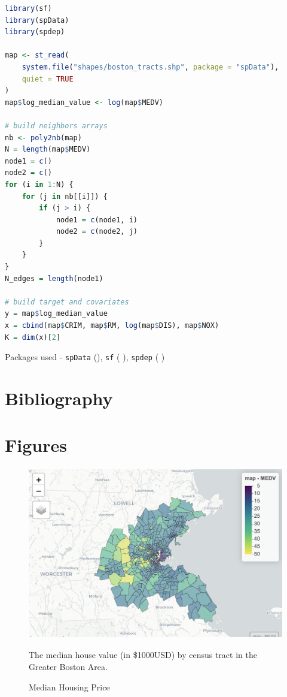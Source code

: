 \documentclass[11pt]{article}
\newcommand{\code}[1]{\colorbox{light-gray}{\texttt{#1}}}
\begin{document}
\begin{lstlisting}[language=R, basicstyle=\small]
library(sf)
library(spData)
library(spdep)

map <- st_read(
    system.file("shapes/boston_tracts.shp", package = "spData"), 
    quiet = TRUE
)
map$log_median_value <- log(map$MEDV)

# build neighbors arrays
nb <- poly2nb(map)
N = length(map$MEDV)
node1 = c()
node2 = c()
for (i in 1:N) {
    for (j in nb[[i]]) {
        if (j > i) {
            node1 = c(node1, i)
            node2 = c(node2, j)
        }
    }
}
N_edges = length(node1)

# build target and covariates
y = map$log_median_value
x = cbind(map$CRIM, map$RM, log(map$DIS), map$NOX)
K = dim(x)[2]
\end{lstlisting}

Packages used - \code{spData} (\cite{spdata}), \code{sf} (\cite{sf1} \cite{sf2}), \code{spdep} (\cite{spdep1} \cite{spdep2} \cite{spdep3} \cite{spdep4})

\newpage

\section{Bibliography}




\newpage



\section{Figures}

\begin{figure}[h!] 
  \centering
  \includegraphics[height=75mm]{prices.png}
  \caption{Median Housing Price}
  \medskip
	\small
	The median house value (in \$1000USD) by census tract in the Greater Boston Area.
  \label{fig:prices}
\end{figure}
\end{document}
